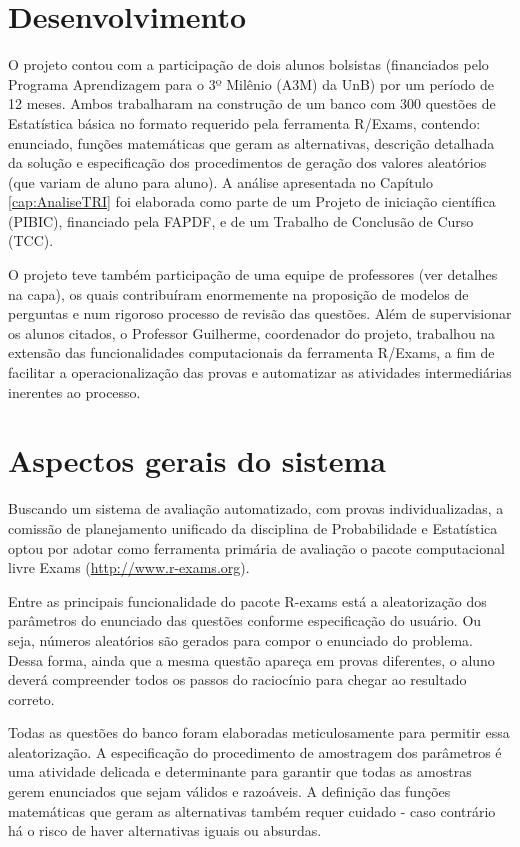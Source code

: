 \documentclass[a4paper]{report}
\begin{document}
\section{Desenvolvimento}

O projeto contou com a participação de dois alunos bolsistas
(financiados pelo Programa Aprendizagem para o 3º Milênio (A3M) da UnB)
por um período de 12 meses. Ambos trabalharam na construção de um banco
com 300 questões de Estatística básica no formato requerido pela
ferramenta R/Exams, contendo: enunciado, funções matemáticas que geram
as alternativas, descrição detalhada da solução e especificação dos
procedimentos de geração dos valores aleatórios (que variam de aluno
para aluno). A análise apresentada no Capítulo \ref{cap:AnaliseTRI} foi
elaborada como parte de um Projeto de iniciação científica (PIBIC),
financiado pela FAPDF, e de um Trabalho de Conclusão de Curso (TCC).

O projeto teve também participação de uma equipe de professores (ver
detalhes na capa), os quais contribuíram enormemente na proposição de
modelos de perguntas e num rigoroso processo de revisão das questões.
Além de supervisionar os alunos citados, o Professor Guilherme,
coordenador do projeto, trabalhou na extensão das funcionalidades
computacionais da ferramenta R/Exams, a fim de facilitar a
operacionalização das provas e automatizar as atividades intermediárias
inerentes ao processo.

\section{Aspectos gerais do sistema} \label{sec:sistema}

Buscando um sistema de avaliação automatizado, com provas
individualizadas, a comissão de planejamento unificado da disciplina de
Probabilidade e Estatística optou por adotar como ferramenta primária de
avaliação o pacote computacional livre Exams
(\url{http://www.r-exams.org}).

Entre as principais funcionalidade do pacote R-exams está a
aleatorização dos parâmetros do enunciado das questões conforme
especificação do usuário. Ou seja, números aleatórios são gerados para
compor o enunciado do problema. Dessa forma, ainda que a mesma questão
apareça em provas diferentes, o aluno deverá compreender todos os passos
do raciocínio para chegar ao resultado correto.

Todas as questões do banco foram elaboradas meticulosamente para
permitir essa aleatorização. A especificação do procedimento de
amostragem dos parâmetros é uma atividade delicada e determinante para
garantir que todas as amostras gerem enunciados que sejam válidos e
razoáveis. A definição das funções matemáticas que geram as alternativas
também requer cuidado - caso contrário há o risco de haver alternativas
iguais ou absurdas.
\end{document}
